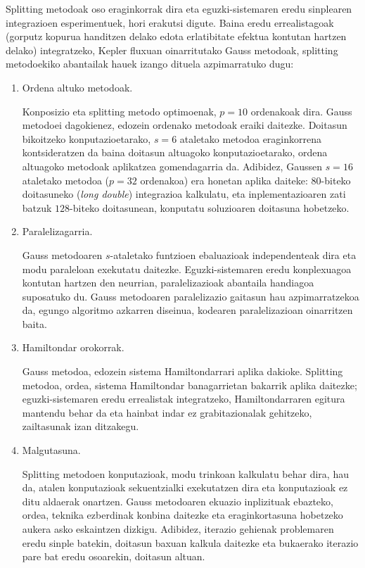 Splitting metodoak oso eraginkorrak dira eta eguzki-sistemaren eredu sinplearen integrazioen  esperimentuek, hori erakutsi digute. Baina eredu errealistagoak (gorputz kopurua handitzen delako edota erlatibitate efektua kontutan hartzen delako) integratzeko, Kepler fluxuan oinarritutako Gauss metodoak, splitting metodoekiko abantailak hauek izango dituela azpimarratuko dugu:  

\begin{enumerate}

\item Ordena altuko metodoak.

Konposizio eta  splitting metodo optimoenak, $p=10$ ordenakoak dira. Gauss metodoei dagokienez, edozein ordenako metodoak eraiki daitezke. Doitasun bikoitzeko konputazioetarako, $s=6$ ataletako metodoa eraginkorrena kontsideratzen da \cite{Hairer2008} baina doitasun altuagoko konputazioetarako, ordena altuagoko metodoak aplikatzea gomendagarria da.
Adibidez, Gaussen $s=16$ ataletako metodoa ($p=32$ ordenakoa) era honetan aplika daiteke: $80$-biteko doitasuneko  (\emph{long double}) integrazioa kalkulatu, eta inplementazioaren zati batzuk $128$-biteko doitasunean, konputatu soluzioaren doitasuna hobetzeko.  

\item Paralelizagarria.

Gauss metodoaren $s$-ataletako funtzioen ebaluazioak independenteak dira eta modu paraleloan exekutatu daitezke. Eguzki-sistemaren eredu konplexuagoa kontutan hartzen den neurrian, paralelizazioak abantaila handiagoa suposatuko du. Gauss metodoaren paralelizazio gaitasun hau azpimarratzekoa da, egungo algoritmo azkarren diseinua, kodearen paralelizazioan oinarritzen baita.

\item Hamiltondar orokorrak.

Gauss metodoa, edozein sistema Hamiltondarrari aplika dakioke. Splitting metodoa, ordea, sistema Hamiltondar banagarrietan bakarrik aplika daitezke; eguzki-sistemaren eredu errealistak integratzeko, Hamiltondarraren egitura mantendu behar da eta hainbat indar ez grabitazionalak  gehitzeko, zailtasunak izan ditzakegu. 

\item Malgutasuna.

Splitting metodoen konputazioak, modu trinkoan kalkulatu behar dira, hau da, atalen konputazioak sekuentzialki exekutatzen dira eta konputazioak ez ditu aldaerak onartzen. Gauss metodoaren ekuazio inplizituak ebazteko, ordea, teknika ezberdinak konbina daitezke eta eraginkortasuna hobetzeko aukera asko eskaintzen dizkigu. Adibidez, iterazio gehienak problemaren eredu sinple batekin, doitasun baxuan kalkula daitezke  \cite{Beylkin2014} eta bukaerako iterazio pare bat eredu osoarekin, doitasun altuan. 


\end{enumerate}
